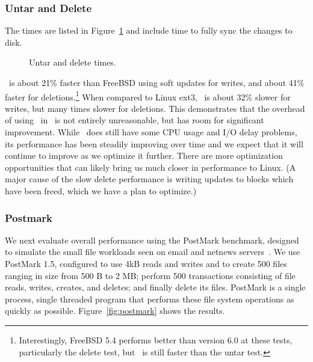 \subsubsection{Untar and Delete}
\label{sec:eval:untardel}

The times are listed in Figure~\ref{fig:macro} and include time to
fully sync the changes to disk.

\begin{figure}[htb]
\caption{\label{fig:macro} Untar and delete times.}
\end{figure}

\Kudos\ is about 21\% faster than FreeBSD using soft updates for
writes, and about 41\% faster for deletions.\footnote{Interestingly, FreeBSD 5.4
performs better than version 6.0 at these tests, particularly the delete test,
but \Kudos\ is still faster than the untar test.}
%
When compared to Linux ext3, \Kudos\ is about 32\% slower for writes, but many
times slower for deletions.
%
This demonstrates that the overhead of using \chdescs\ in \Kudos\ is not
entirely unreasonable, but has room for significant improvement.
%
While \Kudos\ does still have some CPU usage and I/O delay problems, its
performance has been steadily improving over time and we expect that it will
continue to improve as we optimize it further.
%
There are more optimization opportunities that can likely bring us much closer
in performance to Linux. (A major cause of the slow delete performance is writing
updates to blocks which have been freed, which we have a plan to optimize.)

\subsubsection {Postmark}
\label{sec:eval:postmark}

We next evaluate overall performance using the PostMark benchmark,
designed to simulate the small file workloads seen on email and
netnews servers~\cite{postmark}.
%
We use PostMark 1.5, configured to use 4kB reads and writes and to
create 500 files ranging in size from 500 B to 2 MB; perform 500
transactions consisting of file reads, writes, creates, and deletes;
and finally delete its files. PostMark is a single process, single
threaded program that performs these file system operations as quickly
as possible.
%
Figure~\ref{fig:postmark} shows the results.

